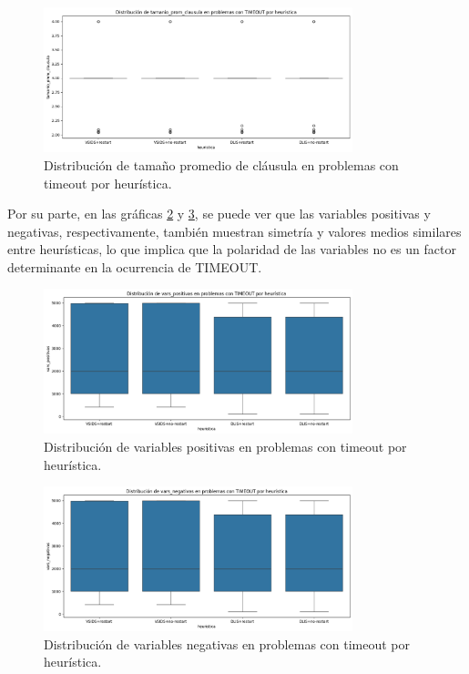 \begin{figure}[ht]
    \centering
    \includegraphics[width=0.8\textwidth]{Graphics/tamanio_prom_claus_timeout_x_heuristica.png}
    \caption{Distribuci\'on de tama\~no promedio de cl\'ausula en problemas con timeout por heur\'istica.}
    \label{fig:tamanio-prom-claus-timeout-x-heuristica}
\end{figure}

Por su parte, en las gr\'aficas \ref{fig:vars-pos-timeout-x-heuristica} y \ref{fig:vars-neg-timeout-x-heuristica}, se puede ver que las variables positivas y negativas, respectivamente, también muestran simetría y valores medios similares entre heurísticas, lo que implica que la polaridad de las variables no es un factor determinante en la ocurrencia de TIMEOUT.

\begin{figure}[ht]
    \centering
    \includegraphics[width=0.8\textwidth]{Graphics/vars_pos_timeout_x_heuristica.png}
    \caption{Distribuci\'on de variables positivas en problemas con timeout por heur\'istica.}
    \label{fig:vars-pos-timeout-x-heuristica}
\end{figure}

\begin{figure}[ht]
    \centering
    \includegraphics[width=0.8\textwidth]{Graphics/vars_neg_timeout_x_heuristica.png}
    \caption{Distribuci\'on de variables negativas en problemas con timeout por heur\'istica.}
    \label{fig:vars-neg-timeout-x-heuristica}
\end{figure}

